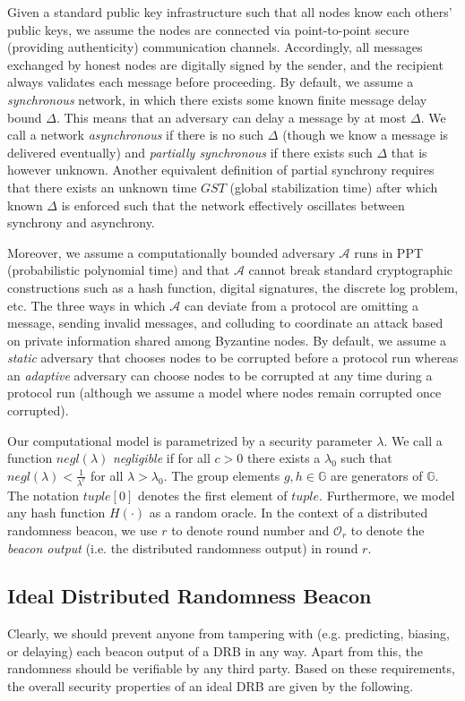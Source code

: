 \documentclass[letterpaper,twocolumn,10pt]{article}
\theoremstyle{definition}
\theoremstyle{remark}
\begin{document}
Given a standard public key infrastructure such that all nodes know each others' public keys, we assume the nodes are connected via point-to-point secure (providing authenticity) communication channels. Accordingly, all messages exchanged by honest nodes are digitally signed by the sender, and the recipient always validates each message before proceeding. By default, we assume a \textit{synchronous} network, in which there exists some known finite message delay bound $\Delta$. This means that an adversary can delay a message by at most $\Delta$. We call a network \textit{asynchronous} if there is no such $\Delta$ (though we know a message is delivered eventually) and \textit{partially synchronous} if there exists such $\Delta$ that is however unknown. Another equivalent definition of partial synchrony \cite{dwork1988consensus} requires that there exists an unknown time $GST$ (global stabilization time) after which known $\Delta$ is enforced such that the network effectively oscillates between synchrony and asynchrony.

Moreover, we assume a computationally bounded adversary $\mathcal{A}$ runs in PPT (probabilistic polynomial time) and that $\mathcal{A}$ cannot break standard cryptographic constructions such as a hash function, digital signatures, the discrete log problem, etc. The three ways in which $\mathcal{A}$ can deviate from a protocol are omitting a message, sending invalid messages, and colluding to coordinate an attack based on private information shared among Byzantine nodes. By default, we assume a \textit{static} adversary that chooses nodes to be corrupted before a protocol run whereas an \textit{adaptive} adversary can choose nodes to be corrupted at any time during a protocol run (although we assume a model where nodes remain corrupted once corrupted).

Our computational model is parametrized by a security parameter $\lambda$. We call a function $negl(\lambda)$ \textit{negligible} if for all $c > 0$ there exists a $\lambda_0$ such that $negl(\lambda) < \frac{1}{\lambda^c}$ for all $\lambda > \lambda_0$. The group elements $g, h \in \mathbb{G}$ are generators of $\mathbb{G}$. The notation $tuple[0]$ denotes the first element of $tuple$. Furthermore, we model any hash function $H(\cdot)$ as a random oracle. In the context of a distributed randomness beacon, we use $r$ to denote round number and $\mathcal{O}_r$ to denote the \textit{beacon output} (i.e. the distributed randomness output) in round $r$.

\subsection{Ideal Distributed Randomness Beacon}
Clearly, we should prevent anyone from tampering with (e.g. predicting, biasing, or delaying) each beacon output of a DRB in any way. Apart from this, the randomness should be verifiable by any third party. Based on these requirements, the overall security properties of an ideal DRB are given by the following.
\end{document}
